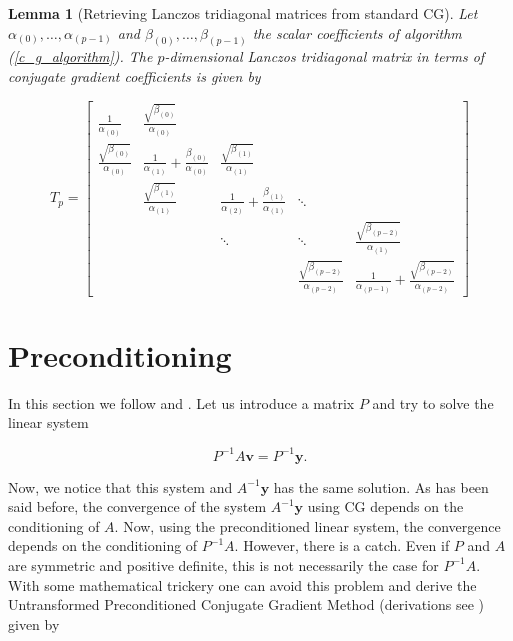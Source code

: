 \documentclass[12pt,a4paper,oneside]{book}
\newtheorem{Lemma}{Lemma}
\begin{document}
\begin{Lemma}[Retrieving Lanczos tridiagonal matrices from standard CG] \label{appendix_lancos_cg}
 Let \linebreak$\alpha_{(0)}, \ldots, \alpha_{(p-1)}$ and $\beta_{(0)}, \ldots, \beta_{(p-1)}$ the scalar coefficients of algorithm (\ref{c_g_algorithm}). The $p$-dimensional Lanczos tridiagonal matrix in terms of conjugate gradient coefficients is given by 

\begin{equation}
T_p = 
	\begin{bmatrix}
    \frac{1}{\alpha_{(0)}} & \frac{\sqrt{\beta_{(0)}}}{\alpha_{(0)}}& & & \\
    \frac{\sqrt{\beta_{(0)}}}{\alpha_{(0)}}  &\frac{1}{\alpha_{(1)}} + \frac{\beta_{(0)}}{\alpha_{(0)}} & \frac{\sqrt{\beta_{(1)}}}{\alpha_{(1)}} & &\\
     & \frac{\sqrt{\beta_{(1)}}}{\alpha_{(1)}} & \frac{1}{\alpha_{(2)}} + \frac{\beta_{(1)}}{\alpha_{(1)}} & \ddots &  \\
     & & \ddots   &\ddots &  \frac{\sqrt{\beta_{(p-2)}}}{\alpha_{(1)}} \\
     & & & \frac{\sqrt{\beta_{(p-2)}}}{\alpha_{(p-2)}} & \frac{1}{\alpha_{(p-1)}} + \frac{\sqrt{\beta_{(p-2)}}}{\alpha_{(p-2)}}
	\end{bmatrix}
\end{equation}
\end{Lemma}

\section{Preconditioning} \label{appendix_preconditioning}

In this section we follow \cite{gardner2018gpytorch} and \cite{shewchuk1994introduction}. Let us introduce a matrix $P$ and try to solve the linear system 

\begin{equation}
P^{-1} A \bm{v} = P^{-1} \bm{y}.
\end{equation}

Now, we notice that this system and $A^{-1} \bm{y}$ has the same solution. As has been said before, the convergence of the system $A^{-1} \bm{y}$ using CG depends on the conditioning of $A$. Now, using the preconditioned linear system, the convergence depends on the conditioning of $P^{-1} A$. However, there is a catch. Even if $P$ and $A$ are symmetric and positive definite, this is not necessarily the case for $P^{-1} A$. With some mathematical trickery one can avoid this problem and derive the Untransformed Preconditioned Conjugate Gradient Method (derivations see \cite{shewchuk1994introduction}) given by 
\end{document}

